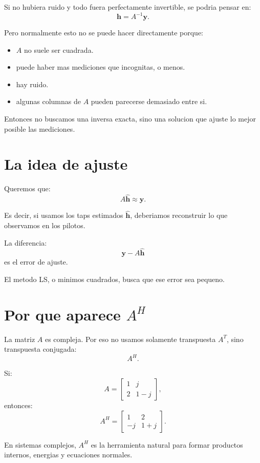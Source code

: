 \documentclass[11pt]{article}
\begin{document}
Si no hubiera ruido y todo fuera perfectamente invertible, se podria pensar en:
\[
    \bm h = A^{-1}\bm y.
\]

Pero normalmente esto no se puede hacer directamente porque:

\begin{itemize}
    \item \(A\) no suele ser cuadrada.
    \item puede haber mas mediciones que incognitas, o menos.
    \item hay ruido.
    \item algunas columnas de \(A\) pueden parecerse demasiado entre si.
\end{itemize}

Entonces no buscamos una inversa exacta, sino una solucion que ajuste lo mejor
posible las mediciones.

\section{La idea de ajuste}

Queremos que:
\[
    A\hat{\bm h} \approx \bm y.
\]

Es decir, si usamos los taps estimados \(\hat{\bm h}\), deberiamos reconstruir
lo que observamos en los pilotos.

La diferencia:
\[
    \bm y - A\hat{\bm h}
\]
es el error de ajuste.

El metodo LS, o minimos cuadrados, busca que ese error sea pequeno.

\section{Por que aparece \(A^H\)}

La matriz \(A\) es compleja. Por eso no usamos solamente transpuesta \(A^T\),
sino transpuesta conjugada:
\[
    A^H.
\]

Si:
\[
    A =
    \begin{bmatrix}
        1 & j\\
        2 & 1-j
    \end{bmatrix},
\]
entonces:
\[
    A^H =
    \begin{bmatrix}
        1 & 2\\
        -j & 1+j
    \end{bmatrix}.
\]

En sistemas complejos, \(A^H\) es la herramienta natural para formar productos
internos, energias y ecuaciones normales.
\end{document}

